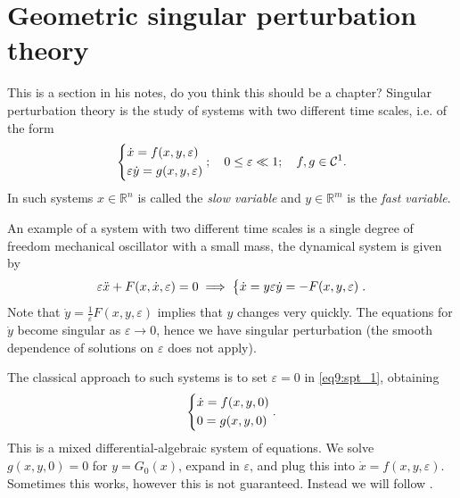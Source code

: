 \section{Geometric singular perturbation theory}
{\color{blue} This is a section in his notes, do you think this should be a chapter?}
Singular perturbation theory is the study of systems with two different time scales, i.e. of the form
\begin{align}
	\begin{dcases}
		\dot{x} = f(x,y,\varepsilon) \\
		\varepsilon \dot{y} = g(x,y,\varepsilon)
	\end{dcases}
	;\quad 0 \leq \varepsilon \ll 1; \quad f,g \in \mathcal{C}^{1}. \label{eq9:spt_1}
\end{align}
In such systems $x \in \mathbb{R}^{n}$ is called the \emph{slow variable} and $y \in \mathbb{R}^{m}$ is the \emph{fast variable}.
\begin{ex}
	An example of a system with two different time scales is a single degree of freedom mechanical oscillator with a small mass, the dynamical system is given by
	\begin{align}
		\varepsilon \ddot{x} + F(x, \dot{x}, \varepsilon) = 0 \implies
		\begin{dcases}
			\dot{x}  =y
			\varepsilon \dot{y} = - F(x,y, \varepsilon)
		\end{dcases}
		.
	\end{align}
	Note that $\dot{y} = \frac{1}{ \varepsilon}F(x,y,\varepsilon)$ implies that $y$ changes very quickly. The equations for $\dot{y}$ become singular as $\varepsilon \to 0$, hence we have singular perturbation (the smooth dependence of solutions on $\varepsilon$ does not apply).
\end{ex}

The classical approach to such systems is to set $\varepsilon =0 $ in \eqref{eq9:spt_1}, obtaining
\begin{align}
	\begin{dcases}
		\dot{x} = f(x,y, 0) \\
		0 = g(x,y,0)
	\end{dcases}
	.
\end{align}
This is a mixed differential-algebraic system of equations. We solve $g (x,y,0)=0$ for $y=G_{0}(x)$, expand in $\varepsilon$, and plug this into $\dot{x}=f(x,y,\varepsilon)$. Sometimes this works, however this is not guaranteed. Instead we will follow \cite{Fenichel1979}.

